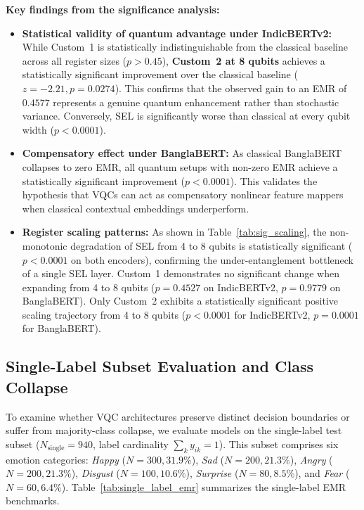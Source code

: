 \documentclass[runningheads]{llncs}
\begin{document}
\noindent\textbf{Key findings from the significance analysis:}
\begin{itemize}[leftmargin=*]
    \item \textbf{Statistical validity of quantum advantage under IndicBERTv2:} While Custom~1 is statistically indistinguishable from the classical baseline across all register sizes ($p > 0.45$), \textbf{Custom~2 at 8 qubits} achieves a statistically significant improvement over the classical baseline ($z = -2.21, p = 0.0274$). This confirms that the observed gain to an EMR of $0.4577$ represents a genuine quantum enhancement rather than stochastic variance. Conversely, SEL is significantly worse than classical at every qubit width ($p < 0.0001$).
    \item \textbf{Compensatory effect under BanglaBERT:} As classical BanglaBERT collapses to zero EMR, all quantum setups with non-zero EMR achieve a statistically significant improvement ($p < 0.0001$). This validates the hypothesis that VQCs can act as compensatory nonlinear feature mappers when classical contextual embeddings underperform.
    \item \textbf{Register scaling patterns:} As shown in Table~\ref{tab:sig_scaling}, the non-monotonic degradation of SEL from 4 to 8 qubits is statistically significant ($p < 0.0001$ on both encoders), confirming the under-entanglement bottleneck of a single SEL layer. Custom~1 demonstrates no significant change when expanding from 4 to 8 qubits ($p = 0.4527$ on IndicBERTv2, $p = 0.9779$ on BanglaBERT). Only Custom~2 exhibits a statistically significant positive scaling trajectory from 4 to 8 qubits ($p < 0.0001$ for IndicBERTv2, $p = 0.0001$ for BanglaBERT).
\end{itemize}

\subsection{Single-Label Subset Evaluation and Class Collapse}\label{sec:single_label}
To examine whether VQC architectures preserve distinct decision boundaries or suffer from majority-class collapse, we evaluate models on the single-label test subset ($N_{\text{single}} = 940$, label cardinality $\sum_k y_{ik} = 1$). This subset comprises six emotion categories: \emph{Happy} ($N=300, 31.9\%$), \emph{Sad} ($N=200, 21.3\%$), \emph{Angry} ($N=200, 21.3\%$), \emph{Disgust} ($N=100, 10.6\%$), \emph{Surprise} ($N=80, 8.5\%$), and \emph{Fear} ($N=60, 6.4\%$). Table~\ref{tab:single_label_emr} summarizes the single-label EMR benchmarks.
\end{document}
